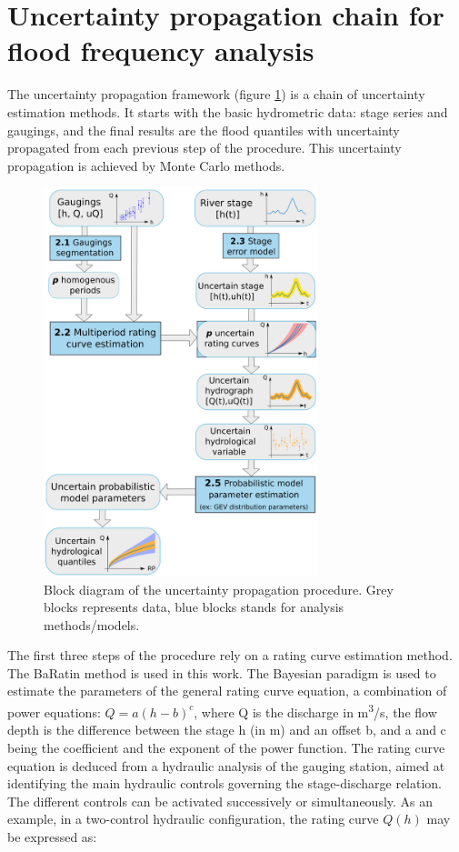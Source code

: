 \documentclass[11pt]{article}
\begin{document}
\section{Uncertainty propagation chain for flood frequency analysis}
    
    The uncertainty propagation framework (figure \ref{fig:ChProp}) is a chain of uncertainty estimation methods. It starts with the basic hydrometric data: stage series and gaugings, and the final results are the flood quantiles with uncertainty propagated from each previous step of the procedure. This uncertainty propagation is achieved by Monte Carlo methods.
    
    \begin{figure}[h!]
        \centering
        \includegraphics[width = 8cm]{Figs/1-uTotSchema.png}
        \caption{Block diagram of the uncertainty propagation procedure. Grey blocks represents data, blue blocks stands for analysis methods/models.}
        \label{fig:ChProp}
    \end{figure}
    
    The first three steps of the procedure rely on a rating curve estimation method. The BaRatin method \citep{le_coz_combining_2014} is used in this work. The Bayesian paradigm is used to estimate the parameters of the general rating curve equation, a combination of power equations: $Q = a(h-b)^c$, where Q is the discharge in m\textsuperscript{3}/s, the flow depth is the difference between the stage h (in m) and an offset b, and a and c being the coefficient and the exponent of the power function. The rating curve equation is deduced from a hydraulic analysis of the gauging station, aimed at identifying the main hydraulic controls governing the stage-discharge relation. The different controls can be activated successively or simultaneously. As an example, in a two-control hydraulic configuration, the rating curve $Q(h)$ may be expressed as: 
    
\end{document}
